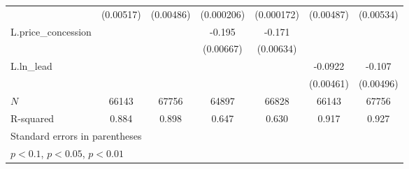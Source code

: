 {\begin{tabular}{l*{6}{c}}
            &   (0.00517)         &   (0.00486)         &  (0.000206)         &  (0.000172)         &   (0.00487)         &   (0.00534)         \\
\addlinespace
L.price\_concession&                     &                     &      -0.195\sym{***}&      -0.171\sym{***}&                     &                     \\
            &                     &                     &   (0.00667)         &   (0.00634)         &                     &                     \\
\addlinespace
L.ln\_lead   &                     &                     &                     &                     &     -0.0922\sym{***}&      -0.107\sym{***}\\
            &                     &                     &                     &                     &   (0.00461)         &   (0.00496)         \\
\midrule
\(N\)       &       66143         &       67756         &       64897         &       66828         &       66143         &       67756         \\
R-squared   &       0.884         &       0.898         &       0.647         &       0.630         &       0.917         &       0.927         \\
\bottomrule
\multicolumn{7}{l}{\footnotesize Standard errors in parentheses}\\
\multicolumn{7}{l}{\footnotesize \sym{*} \(p<0.1\), \sym{**} \(p<0.05\), \sym{***} \(p<0.01\)}\\
\end{tabular}
}
